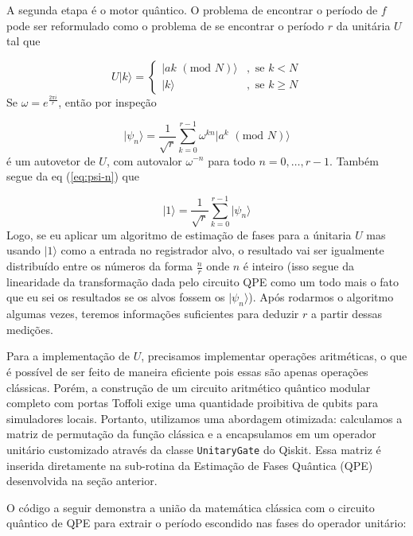 \documentclass[12pt, a4paper]{article}
\newcommand{\ket}[1]{\lvert #1 \rangle}
\begin{document}
A segunda etapa é o motor quântico. O problema de encontrar o período de $f$ pode ser reformulado como o problema de se encontrar o período $r$ da unitária $U$ tal que

\begin{equation}
U \ket{k} = 
\left\{
\begin{array}{ll}
\ket{ak \,\,(\mathrm{mod}\,\, N)} & , \mbox{ se }k < N\\
\ket{k}  & , \mbox{ se }k \geq N
\end{array}
\right.
\end{equation}
Se $\omega = e^{\frac{2 \pi i}{r}}$, então por inspeção

\begin{equation}
\ket{\psi_n} = \frac{1}{\sqrt{r}}\sum_{k=0}^{r-1} \omega^{kn}\ket{a^k\,\, (\mathrm{mod} \,\, N)}
\label{eq:psi-n}
\end{equation}
é um autovetor de $U$, com autovalor $\omega^{-n}$ para todo $n = 0, \ldots, r-1$. Também segue da eq (\ref{eq:psi-n}) que

\begin{equation}
\ket{1} = \frac{1}{\sqrt{r}}\sum_{k=0}^{r-1} \ket{\psi_n}
\label{eq:ket1}
\end{equation}
Logo, se eu aplicar um algoritmo de estimação de fases para a únitaria $U$ mas usando $\ket{1}$ como a entrada no registrador alvo, o resultado vai ser igualmente distribuído entre os números da forma $\frac{n}{r}$ onde $n$ é inteiro (isso segue da linearidade da transformação dada pelo circuito QPE como um todo mais o fato que eu sei os resultados se os alvos fossem os $\ket{\psi_n}$). Após rodarmos o algoritmo algumas vezes, teremos informações suficientes para deduzir $r$ a partir dessas medições.

Para a implementação de $U$, precisamos implementar operações aritméticas, o que é possível de ser feito de maneira eficiente pois essas são apenas operações clássicas. Porém, a construção de um circuito aritmético quântico modular completo com portas Toffoli exige uma quantidade proibitiva de qubits para simuladores locais. Portanto, utilizamos uma abordagem otimizada: calculamos a matriz de permutação da função clássica e a encapsulamos em um operador unitário customizado através da classe \texttt{UnitaryGate} do Qiskit. Essa matriz é inserida diretamente na sub-rotina da Estimação de Fases Quântica (QPE) desenvolvida na seção anterior.

O código a seguir demonstra a união da matemática clássica com o circuito quântico de QPE para extrair o período escondido nas fases do operador unitário:
\end{document}
